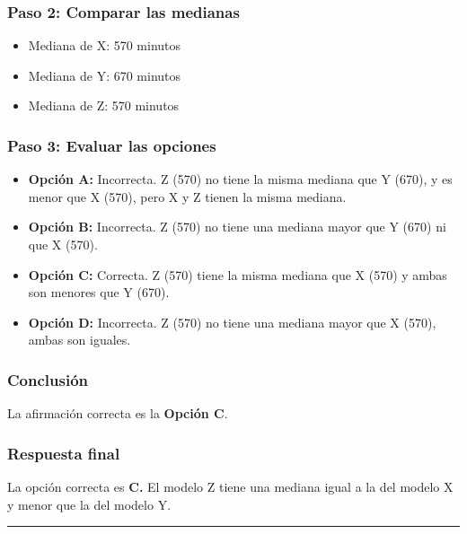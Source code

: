 \documentclass[
]{article}
\providecommand{\tightlist}{%
  \setlength{\itemsep}{0pt}\setlength{\parskip}{0pt}}
\begin{document}
\subsubsection{Paso 2: Comparar las
medianas}\label{paso-2-comparar-las-medianas}

\begin{itemize}
\tightlist
\item
  Mediana de X: 570 minutos
\item
  Mediana de Y: 670 minutos
\item
  Mediana de Z: 570 minutos
\end{itemize}

\subsubsection{Paso 3: Evaluar las
opciones}\label{paso-3-evaluar-las-opciones}

\begin{itemize}
\item
  \textbf{Opción A:} Incorrecta. Z (570) no tiene la misma mediana que Y
  (670), y es menor que X (570), pero X y Z tienen la misma mediana.
\item
  \textbf{Opción B:} Incorrecta. Z (570) no tiene una mediana mayor que
  Y (670) ni que X (570).
\item
  \textbf{Opción C:} Correcta. Z (570) tiene la misma mediana que X
  (570) y ambas son menores que Y (670).
\item
  \textbf{Opción D:} Incorrecta. Z (570) no tiene una mediana mayor que
  X (570), ambas son iguales.
\end{itemize}

\subsubsection{Conclusión}\label{conclusiuxf3n-2}

La afirmación correcta es la \textbf{Opción C}.

\subsubsection{Respuesta final}\label{respuesta-final}

La opción correcta es \textbf{C.} El modelo Z tiene una mediana igual a
la del modelo X y menor que la del modelo Y.

\begin{center}\rule{0.5\linewidth}{0.5pt}\end{center}
\end{document}
